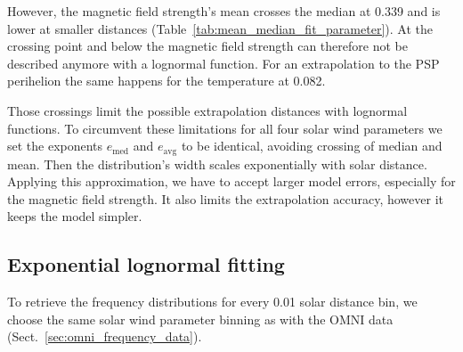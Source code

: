 However, the magnetic field strength's mean crosses the median at \SI{0.339}{\au} and is lower at smaller distances (Table~\ref{tab:mean_median_fit_parameter}). At the crossing point and below the magnetic field strength can therefore not be described anymore with a lognormal function. For an extrapolation to the PSP perihelion the same happens for the temperature at \SI{0.082}{\au}.

Those crossings limit the possible extrapolation distances with lognormal functions. To circumvent these limitations for all four solar wind parameters we set the exponents $e_\text{med}$ and $e_\text{avg}$ to be identical, avoiding crossing of median and mean. Then the distribution's width scales exponentially with solar distance. Applying this approximation, we have to accept larger model errors, especially for the magnetic field strength. It also limits the extrapolation accuracy, however it keeps the model simpler.

\subsection{Exponential lognormal fitting}
To retrieve the frequency distributions for every \SI{0.01}{\au} solar distance bin, we choose the same solar wind parameter binning as with the OMNI data (Sect.~\ref{sec:omni_frequency_data}).

